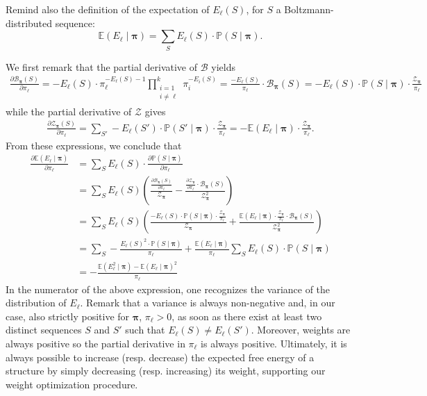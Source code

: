 \documentclass{bioinfo}
\newcommand{\partfun}[1]{\mathcal{Z}_{#1}}
\begin{document}
Remind also the definition of the expectation of $E_\ell(S)$, for $S$ a Boltzmann-distributed sequence:
$$\mathbb{E}(E_\ell\mid \pmb{\pi}) = \sum_S E_\ell(S)\cdot \mathbb{P}(S\mid \pmb{\pi}).$$

We first remark that the partial derivative of $\mathcal{B}$ yields
\begin{align*} 
  \frac{\partial \mathcal{B}_{\pmb{\pi}}(S)}{\partial \pi_\ell} = -E_\ell(S)\cdot \pi_\ell^{-E_\ell(S)-1}\prod_{\substack{i=1\\i\neq \ell}}^{k} \pi_i^{-E_i(S)} = \frac{-E_\ell(S)}{\pi_\ell}\cdot\mathcal{B}_{\pmb{\pi}}(S) = -E_\ell(S)\cdot \mathbb{P}(S\mid \pmb{\pi})\cdot \frac{\partfun{\pmb{\pi}}}{\pi_\ell }
\end{align*}
while the partial derivative of $\mathcal{Z}$ gives 
\begin{align*} 
  \frac{\partial \partfun{\pmb{\pi}}(S)}{\partial \pi_\ell} = \sum_{S'} -E_\ell(S')\cdot \mathbb{P}(S'\mid \pmb{\pi})\cdot \frac{\partfun{\pmb{\pi}}}{\pi_\ell }= -\mathbb{E}(E_\ell\mid \pmb{\pi})\cdot \frac{\partfun{\pmb{\pi}}}{\pi_\ell}.
\end{align*}
From these expressions, we conclude that
\begin{align*} 
  \frac{\partial \mathbb{E}(E_\ell\mid \pmb{\pi})}{\partial \pi_\ell} &= \sum_S E_\ell(S)\cdot\frac{\partial \mathbb{P}(S\mid \pmb{\pi})}{\partial \pi_\ell}\\
  & = \sum_S E_\ell(S)\left(\frac{\frac{\partial \mathcal{B}_{\pmb{\pi}}(S)}{\partial \pi_\ell}}{\mathcal{Z}_{\pmb{\pi}}} - \frac{\frac{\partial \mathcal{Z}_{\pmb{\pi}}}{\partial \pi_\ell}\cdot\mathcal{B}_{\pmb{\pi}}(S)}{\mathcal{Z}_{\pmb{\pi}}^2}\right)\\
  & = \sum_S E_\ell(S)\left(\frac{-E_\ell(S)\cdot \mathbb{P}(S\mid \pmb{\pi})\cdot \frac{\mathcal{Z}_{\pmb{\pi}}}{\pi_\ell }}{\mathcal{Z}_{\pmb{\pi}}} + \frac{\mathbb{E}(E_\ell\mid \pmb{\pi})\cdot \frac{\mathcal{Z}_{\pmb{\pi}}}{\pi_\ell}\cdot\mathcal{B}_{\pmb{\pi}}(S)}{\mathcal{Z}_{\pmb{\pi}}^2}\right)\\
  & = \sum_S - \frac{E_\ell(S)^2\cdot\mathbb{P}(S\mid \pmb{\pi})}{\pi_\ell} + \frac{\mathbb{E}(E_\ell\mid \pmb{\pi})}{\pi_\ell}\sum_S E_\ell(S)\cdot \mathbb{P}(S\mid \pmb{\pi})\\
  & = -\frac{\mathbb{E}(E_\ell^2\mid \pmb{\pi}) - \mathbb{E}(E_\ell\mid \pmb{\pi})^2}{\pi_\ell}
\end{align*}
In the numerator of the above expression, one recognizes the variance of the distribution of $E_\ell$.
Remark that a variance is always non-negative and, in our case, also strictly positive for $\pmb{\pi}$, $\pi_\ell>0$, as soon as there exist at least two distinct sequences $S$ and $S'$ such that $E_\ell(S)\neq E_\ell(S')$.
Moreover, weights are always positive so the partial derivative in $\pi_\ell$ is always positive. Ultimately, it is always possible to increase (resp. decrease) the expected free energy of a structure by simply decreasing (resp. increasing) its weight, supporting our weight optimization procedure.
\newpage
\end{document}
